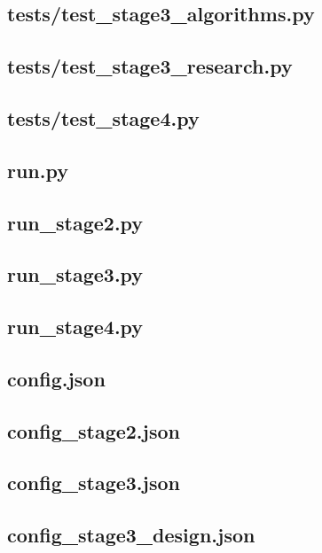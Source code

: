 \documentclass{mathorcup-journal}
\begin{document}
\subsection*{tests/test\_stage3\_algorithms.py}

\subsection*{tests/test\_stage3\_research.py}

\subsection*{tests/test\_stage4.py}

\subsection*{run.py}

\subsection*{run\_stage2.py}

\subsection*{run\_stage3.py}

\subsection*{run\_stage4.py}

\subsection*{config.json}

\subsection*{config\_stage2.json}

\subsection*{config\_stage3.json}

\subsection*{config\_stage3\_design.json}

\end{document}
